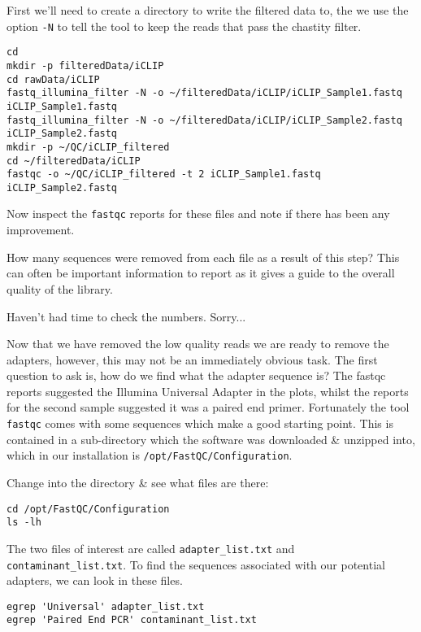 First we'll need to create a directory to write the filtered data to, the we use the option \texttt{-N} to tell the tool to keep the reads that pass the chastity filter.

\begin{lstlisting}
cd
mkdir -p filteredData/iCLIP
cd rawData/iCLIP
fastq_illumina_filter -N -o ~/filteredData/iCLIP/iCLIP_Sample1.fastq iCLIP_Sample1.fastq
fastq_illumina_filter -N -o ~/filteredData/iCLIP/iCLIP_Sample2.fastq iCLIP_Sample2.fastq
mkdir -p ~/QC/iCLIP_filtered
cd ~/filteredData/iCLIP
fastqc -o ~/QC/iCLIP_filtered -t 2 iCLIP_Sample1.fastq iCLIP_Sample2.fastq
\end{lstlisting}

Now inspect the \texttt{fastqc} reports for these files and note if there has been any improvement.
\begin{questions}
How many sequences were removed from each file as a result of this step?
This can often be important information to report as it gives a guide to the overall quality of the library. \\
\begin{answer}
Haven't had time to check the numbers. 
Sorry... \\
\end{answer}
\end{questions}

Now that we have removed the low quality reads we are ready to remove the adapters, however, this may not be an immediately obvious task.
The first question to ask is, how do we find what the adapter sequence is?
The fastqc reports suggested the Illumina Universal Adapter in the plots, whilst the reports for the second sample suggested it was a paired end primer.
Fortunately the tool \texttt{fastqc} comes with some sequences which make a good starting point.
This is contained in a sub-directory which the software was downloaded \& unzipped into, which in our installation is \texttt{/opt/FastQC/Configuration}.

\begin{steps}
Change into the directory \& see what files are there:
\begin{lstlisting}
cd /opt/FastQC/Configuration
ls -lh
\end{lstlisting}
\end{steps}

\begin{steps}
The two files of interest are called \texttt{adapter_list.txt} and \texttt{contaminant_list.txt}.
To find the sequences associated with our potential adapters, we can look in these files.
\begin{lstlisting}
egrep 'Universal' adapter_list.txt
egrep 'Paired End PCR' contaminant_list.txt
\end{lstlisting}
\end{steps}

